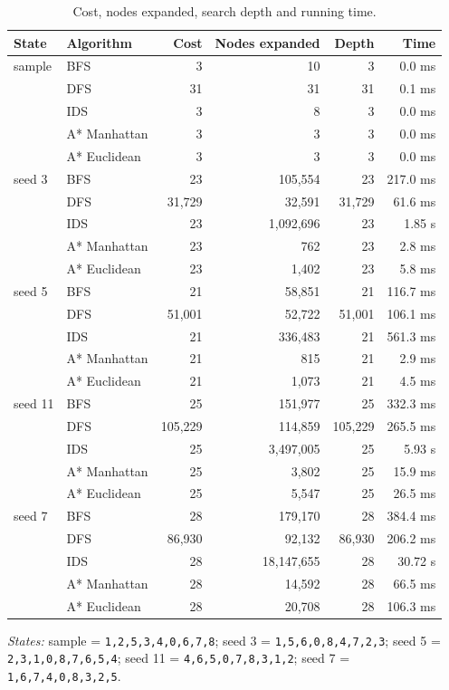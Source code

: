 \documentclass[11pt,a4paper]{article}
\begin{document}
\begin{table}[H]\centering\small
\caption{Cost, nodes expanded, search depth and running time.}
\begin{tabular}{llrrrr}\toprule
State & Algorithm & Cost & Nodes expanded & Depth & Time\\\midrule
sample & BFS & 3 & 10 & 3 & 0.0 ms \\
 & DFS & 31 & 31 & 31 & 0.1 ms \\
 & IDS & 3 & 8 & 3 & 0.0 ms \\
 & A* Manhattan & 3 & 3 & 3 & 0.0 ms \\
 & A* Euclidean & 3 & 3 & 3 & 0.0 ms \\
\midrule
seed 3 & BFS & 23 & 105{,}554 & 23 & 217.0 ms \\
 & DFS & 31{,}729 & 32{,}591 & 31{,}729 & 61.6 ms \\
 & IDS & 23 & 1{,}092{,}696 & 23 & 1.85 s \\
 & A* Manhattan & 23 & 762 & 23 & 2.8 ms \\
 & A* Euclidean & 23 & 1{,}402 & 23 & 5.8 ms \\
\midrule
seed 5 & BFS & 21 & 58{,}851 & 21 & 116.7 ms \\
 & DFS & 51{,}001 & 52{,}722 & 51{,}001 & 106.1 ms \\
 & IDS & 21 & 336{,}483 & 21 & 561.3 ms \\
 & A* Manhattan & 21 & 815 & 21 & 2.9 ms \\
 & A* Euclidean & 21 & 1{,}073 & 21 & 4.5 ms \\
\midrule
seed 11 & BFS & 25 & 151{,}977 & 25 & 332.3 ms \\
 & DFS & 105{,}229 & 114{,}859 & 105{,}229 & 265.5 ms \\
 & IDS & 25 & 3{,}497{,}005 & 25 & 5.93 s \\
 & A* Manhattan & 25 & 3{,}802 & 25 & 15.9 ms \\
 & A* Euclidean & 25 & 5{,}547 & 25 & 26.5 ms \\
\midrule
seed 7 & BFS & 28 & 179{,}170 & 28 & 384.4 ms \\
 & DFS & 86{,}930 & 92{,}132 & 86{,}930 & 206.2 ms \\
 & IDS & 28 & 18{,}147{,}655 & 28 & 30.72 s \\
 & A* Manhattan & 28 & 14{,}592 & 28 & 66.5 ms \\
 & A* Euclidean & 28 & 20{,}708 & 28 & 106.3 ms \\
\midrule
\bottomrule\end{tabular}\end{table}
\textit{States:} sample = \texttt{1,2,5,3,4,0,6,7,8}; seed 3 = \texttt{1,5,6,0,8,4,7,2,3}; seed 5 = \texttt{2,3,1,0,8,7,6,5,4}; seed 11 = \texttt{4,6,5,0,7,8,3,1,2}; seed 7 = \texttt{1,6,7,4,0,8,3,2,5}.
\end{document}
